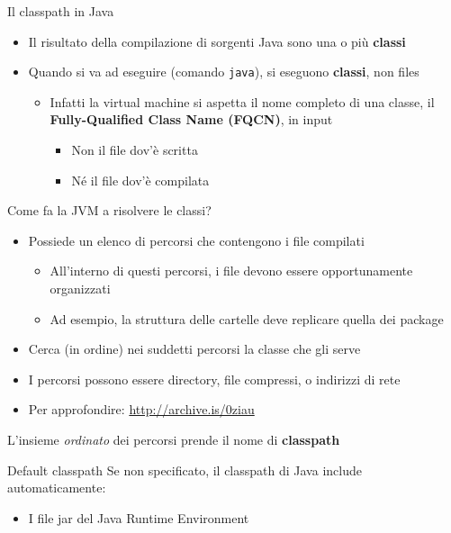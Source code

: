 \documentclass[xcolor=dvipsnames,presentation]{beamer}
\begin{document}
\begin{frame}[allowframebreaks]{Il classpath in Java}
	\begin{itemize}
		\item Il risultato della compilazione di sorgenti Java sono una o più \textbf{classi}
		\item Quando si va ad eseguire (comando \texttt{java}), si eseguono \textbf{classi}, non files
		\begin{itemize}
			\item Infatti la virtual machine si aspetta il nome completo di una classe, il \textbf{Fully-Qualified Class Name (FQCN)}, in input
			\begin{itemize}
				\item Non il file dov'è scritta
				\item Né il file dov'è compilata
			\end{itemize}
		\end{itemize}
	\end{itemize}
	\begin{block}{Come fa la JVM a risolvere le classi?}
		\begin{itemize}
			\item Possiede un elenco di percorsi che contengono i file compilati
			\begin{itemize}
				\item All'interno di questi percorsi, i file devono essere opportunamente organizzati
				\item Ad esempio, la struttura delle cartelle deve replicare quella dei package
			\end{itemize}
			\item Cerca (in ordine) nei suddetti percorsi la classe che gli serve
			\item I percorsi possono essere directory, file compressi, o indirizzi di rete
			\item Per approfondire: \url{http://archive.is/0ziau}
		\end{itemize}
	\end{block}
	\begin{center}
		L'insieme \emph{ordinato} dei percorsi prende il nome di \textbf{classpath}
	\end{center}
	\begin{block}{Default classpath}
		Se non specificato, il classpath di Java include automaticamente:
		\begin{itemize}
			\item I file jar del Java Runtime Environment
			\begin{itemize}

\end{itemize}
\end{itemize}
\end{block}
\end{frame}
\end{document}
